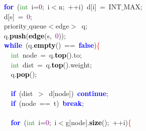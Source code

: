 {{\mbox{}\ \ \ \ \textbf{\textcolor{Blue}{for}}\ \textcolor{BrickRed}{(}\textcolor{ForestGreen}{int}\ i\textcolor{BrickRed}{=}\textcolor{Purple}{0}\textcolor{BrickRed}{;}\ i\textcolor{BrickRed}{$<$}n\textcolor{BrickRed}{;}\ \textcolor{BrickRed}{++}i\textcolor{BrickRed}{)}\ d\textcolor{BrickRed}{[}i\textcolor{BrickRed}{]}\ \textcolor{BrickRed}{=}\ INT$\_$MAX\textcolor{BrickRed}{;} \\
\mbox{}\ \ \ \ d\textcolor{BrickRed}{[}s\textcolor{BrickRed}{]}\ \textcolor{BrickRed}{=}\ \textcolor{Purple}{0}\textcolor{BrickRed}{;} \\
\mbox{}\ \ \ \ priority$\_$queue\textcolor{BrickRed}{$<$}edge\textcolor{BrickRed}{$>$}\ q\textcolor{BrickRed}{;} \\
\mbox{}\ \ \ \ q\textcolor{BrickRed}{.}\textbf{\textcolor{Black}{push}}\textcolor{BrickRed}{(}\textbf{\textcolor{Black}{edge}}\textcolor{BrickRed}{(}s\textcolor{BrickRed}{,}\ \textcolor{Purple}{0}\textcolor{BrickRed}{));} \\
\mbox{}\ \ \ \ \textbf{\textcolor{Blue}{while}}\ \textcolor{BrickRed}{(}q\textcolor{BrickRed}{.}\textbf{\textcolor{Black}{empty}}\textcolor{BrickRed}{()}\ \textcolor{BrickRed}{==}\ \textbf{\textcolor{Blue}{false}}\textcolor{BrickRed}{)}\textcolor{Red}{\{} \\
\mbox{}\ \ \ \ \ \ \textcolor{ForestGreen}{int}\ node\ \textcolor{BrickRed}{=}\ q\textcolor{BrickRed}{.}\textbf{\textcolor{Black}{top}}\textcolor{BrickRed}{().}to\textcolor{BrickRed}{;} \\
\mbox{}\ \ \ \ \ \ \textcolor{ForestGreen}{int}\ dist\ \textcolor{BrickRed}{=}\ q\textcolor{BrickRed}{.}\textbf{\textcolor{Black}{top}}\textcolor{BrickRed}{().}weight\textcolor{BrickRed}{;} \\
\mbox{}\ \ \ \ \ \ q\textcolor{BrickRed}{.}\textbf{\textcolor{Black}{pop}}\textcolor{BrickRed}{();} \\
\mbox{} \\
\mbox{}\ \ \ \ \ \ \textbf{\textcolor{Blue}{if}}\ \textcolor{BrickRed}{(}dist\ \textcolor{BrickRed}{$>$}\ d\textcolor{BrickRed}{[}node\textcolor{BrickRed}{])}\ \textbf{\textcolor{Blue}{continue}}\textcolor{BrickRed}{;} \\
\mbox{}\ \ \ \ \ \ \textbf{\textcolor{Blue}{if}}\ \textcolor{BrickRed}{(}node\ \textcolor{BrickRed}{==}\ t\textcolor{BrickRed}{)}\ \textbf{\textcolor{Blue}{break}}\textcolor{BrickRed}{;} \\
\mbox{} \\
\mbox{}\ \ \ \ \ \ \textbf{\textcolor{Blue}{for}}\ \textcolor{BrickRed}{(}\textcolor{ForestGreen}{int}\ i\textcolor{BrickRed}{=}\textcolor{Purple}{0}\textcolor{BrickRed}{;}\ i\textcolor{BrickRed}{$<$}g\textcolor{BrickRed}{[}node\textcolor{BrickRed}{].}\textbf{\textcolor{Black}{size}}\textcolor{BrickRed}{();}\ \textcolor{BrickRed}{++}i\textcolor{BrickRed}{)}\textcolor{Red}{\{} \\
}}
